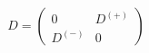 \begin{equation}\label{HH}
D =\left(
\begin{array}{cc}
0&D^{(+)}\\
D^{(-)}&0
\end{array}\right)
\end{equation}

